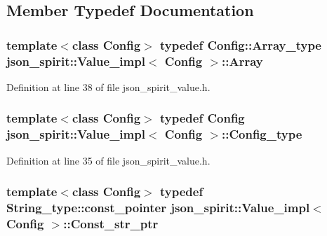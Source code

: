 \subsection{Member Typedef Documentation}
\hypertarget{classjson__spirit_1_1_value__impl_a8cbad4704c204a3421817f08a0b44dd6}{}
\subsubsection[{Array}]{\setlength{\rightskip}{0pt plus 5cm}template$<$class Config$>$ typedef {\bf Config\+::\+Array\+\_\+type} {\bf json\+\_\+spirit\+::\+Value\+\_\+impl}$<$ {\bf Config} $>$\+::{\bf Array}}\label{classjson__spirit_1_1_value__impl_a8cbad4704c204a3421817f08a0b44dd6}


Definition at line 38 of file json\+\_\+spirit\+\_\+value.\+h.

\hypertarget{classjson__spirit_1_1_value__impl_a5dc93efdb2aae96d96c9fedf37ace554}{}
\subsubsection[{Config\+\_\+type}]{\setlength{\rightskip}{0pt plus 5cm}template$<$class Config$>$ typedef {\bf Config} {\bf json\+\_\+spirit\+::\+Value\+\_\+impl}$<$ {\bf Config} $>$\+::{\bf Config\+\_\+type}}\label{classjson__spirit_1_1_value__impl_a5dc93efdb2aae96d96c9fedf37ace554}


Definition at line 35 of file json\+\_\+spirit\+\_\+value.\+h.

\hypertarget{classjson__spirit_1_1_value__impl_ae789c7abc9da932853db9493ddbe6101}{}
\subsubsection[{Const\+\_\+str\+\_\+ptr}]{\setlength{\rightskip}{0pt plus 5cm}template$<$class Config$>$ typedef String\+\_\+type\+::const\+\_\+pointer {\bf json\+\_\+spirit\+::\+Value\+\_\+impl}$<$ {\bf Config} $>$\+::{\bf Const\+\_\+str\+\_\+ptr}}\label{classjson__spirit_1_1_value__impl_ae789c7abc9da932853db9493ddbe6101}


